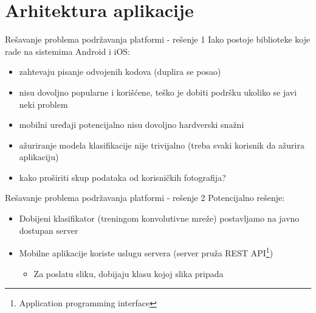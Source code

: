 \documentclass{beamer}
\begin{document}
\section{Arhitektura aplikacije}
\begin{frame}{Rešavanje problema podržavanja platformi - rešenje 1}
    Iako postoje biblioteke koje rade na sistemima Android i iOS:
    \begin{itemize}
        \item zahtevaju pisanje odvojenih kodova (duplira se posao)
        \item nisu dovoljno popularne i korišćene, teško je dobiti podršku ukoliko se javi neki problem
        \item mobilni uređaji potencijalno nisu dovoljno hardverski snažni
        \item ažuriranje modela klasifikacije nije trivijalno (treba svaki korisnik da ažurira aplikaciju)
        \item kako proširiti skup podataka od korisničkih fotografija?
    \end{itemize}
\end{frame}
\begin{frame}{Rešavanje problema podržavanja platformi - rešenje 2}
    Potencijalno rešenje:
    \begin{itemize}
        \item Dobijeni klasifikator (treningom konvolutivne mreže) postavljamo na javno dostupan server
        \item Mobilne aplikacije koriste uslugu servera (server pruža REST \cite{rest} API\footnote{Application programming interface})
        \begin{itemize}
            \item Za poslatu sliku, dobijaju klasu kojoj slika pripada
        \end{itemize}
    \end{itemize}
\end{frame}
\end{document}
